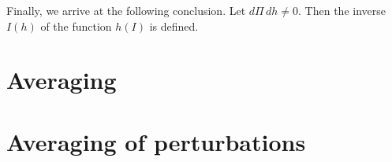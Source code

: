 \documentclass[leqno]{report}
\numberwithin{equation}{section}
\theoremstyle{plain}
\theoremstyle{definition}
\theoremstyle{remark}
\theoremstyle{smallcap}
\numberwithin{prob}{section}
\begin{document}
Finally, we arrive at the following conclusion.
%
Let $d\Pi \, dh \ne 0$.
%
Then the inverse $I(h)$ of the function $h(I)$ is defined.

\section{Averaging}

\section{Averaging of perturbations}

%
%
%
%
%
%
%
%
%
\end{document}

